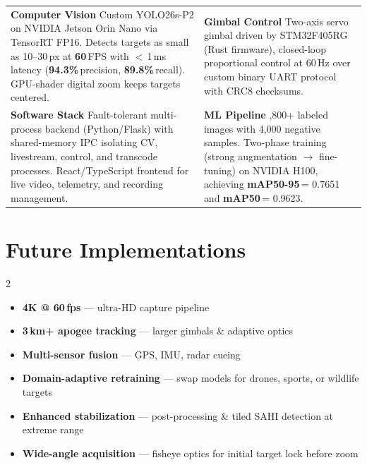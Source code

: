 \documentclass[10pt, letterpaper]{article}
\newcommand{\metric}[2]{\textbf{#1}\,#2}
\begin{document}
\vspace{-2pt}
\begin{tabularx}{\textwidth}{@{}XX@{}}
\textbf{\color{accent}Computer Vision} \newline
Custom YOLO26s-P2 on NVIDIA Jetson Orin Nano via TensorRT FP16. Detects targets as small as 10--30\,px at \metric{60}{FPS} with $<$\,1\,ms latency (\metric{94.3\%}{precision}, \metric{89.8\%}{recall}). GPU-shader digital zoom keeps targets centered.
&
\textbf{\color{accent}Gimbal Control} \newline
Two-axis servo gimbal driven by STM32F405RG (Rust firmware), closed-loop proportional control at 60\,Hz over custom binary UART protocol with CRC8 checksums.
\\[4pt]
\textbf{\color{accent}Software Stack} \newline
Fault-tolerant multi-process backend (Python/Flask) with shared-memory IPC isolating CV, livestream, control, and transcode processes. React/TypeScript frontend for live video, telemetry, and recording management.
&
\textbf{\color{accent}ML Pipeline} \newline
15,800+ labeled images with 4,000 negative samples. Two-phase training (strong augmentation $\rightarrow$ fine-tuning) on NVIDIA H100, achieving \metric{mAP50-95}{= 0.7651} and \metric{mAP50}{= 0.9623}.
\end{tabularx}

\section*{Future Implementations}

\vspace{-2pt}
\begin{multicols}{2}
\begin{itemize}[leftmargin=1.2em, itemsep=1pt, parsep=0pt, topsep=0pt]
    \item \textbf{4K @ 60\,fps} --- ultra-HD capture pipeline
    \item \textbf{3\,km+ apogee tracking} --- larger gimbals \& adaptive optics
    \item \textbf{Multi-sensor fusion} --- GPS, IMU, radar cueing
    \item \textbf{Domain-adaptive retraining} --- swap models for drones, sports, or wildlife targets
    \item \textbf{Enhanced stabilization} --- post-processing \& tiled SAHI detection at extreme range
    \item \textbf{Wide-angle acquisition} --- fisheye optics for initial target lock before zoom
\end{itemize}
\end{multicols}
\end{document}
